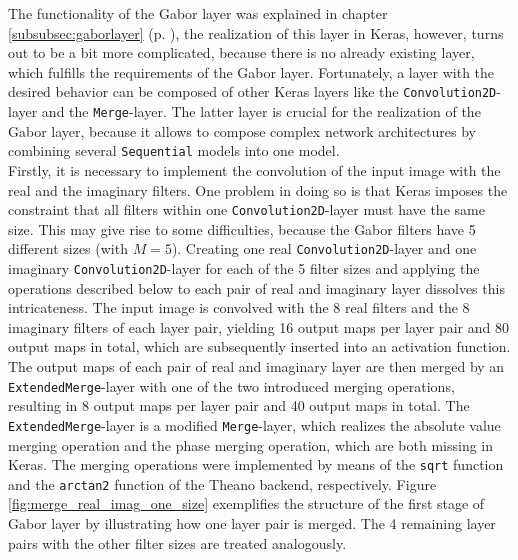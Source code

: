 \documentclass[11pt, a4paper]{article}
\newcommand\myref[1]{\ref{#1} (p. \pageref{#1})}
\begin{document}
\begin{appendix}
The functionality of the Gabor layer was explained in chapter \myref{subsubsec:gaborlayer}, the realization of this layer in Keras, however, turns out to be a bit more complicated, because there is no already existing layer, which fulfills the requirements of the Gabor layer.  Fortunately, a layer with the desired behavior can be composed of other Keras layers like the \texttt{Convolution2D}-layer and the \texttt{Merge}-layer. The latter layer is crucial for the realization of the Gabor layer, because it allows to compose complex network architectures by combining several \texttt{Sequential} models into one model.\\
Firstly, it is necessary to implement the convolution of the input image with the real and the imaginary filters. One problem in doing so is that Keras imposes the constraint that all filters within one \texttt{Convolution2D}-layer must have the same size. This may give rise to some difficulties, because the Gabor filters have 5 different sizes (with $M = 5$). Creating one real \texttt{Convolution2D}-layer and one imaginary \texttt{Convolution2D}-layer for each of the 5 filter sizes and applying the operations described below to each pair of real and imaginary layer dissolves this intricateness. The input image is convolved with the 8 real filters and the 8 imaginary filters of each layer pair, yielding 16 output maps per layer pair and 80 output maps in total, which are subsequently inserted into an activation function. The output maps of each pair of  real and imaginary layer are then merged by an \texttt{ExtendedMerge}-layer with one of the two introduced merging operations, resulting in 8 output maps per layer pair and 40 output maps in total. The \texttt{ExtendedMerge}-layer is a modified \texttt{Merge}-layer, which realizes the absolute value merging operation and the phase merging operation, which are both missing in Keras. The merging operations were implemented by means of the \texttt{sqrt} function and the \texttt{arctan2} function of the Theano backend, respectively. Figure \ref{fig:merge_real_imag_one_size} exemplifies the structure of the first stage of Gabor layer by illustrating how one layer pair is merged. The 4 remaining layer pairs with the other filter sizes are treated analogously.



\end{appendix}
\end{document}
